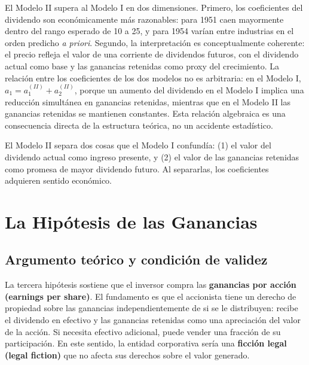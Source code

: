 \documentclass[12pt]{article}
\begin{document}
\begin{explicacion}
El Modelo II supera al Modelo I en dos dimensiones. Primero, los coeficientes del dividendo son econ\'omicamente m\'as razonables: para 1951 caen mayormente dentro del rango esperado de 10 a 25, y para 1954 var\'ian entre industrias en el orden predicho \textit{a priori}. Segundo, la interpretaci\'on es conceptualmente coherente: el precio refleja el valor de una corriente de dividendos futuros, con el dividendo actual como base y las ganancias retenidas como proxy del crecimiento. La relaci\'on entre los coeficientes de los dos modelos no es arbitraria: en el Modelo I, $a_1 = a_1^{(II)} + a_2^{(II)}$, porque un aumento del dividendo en el Modelo I implica una reducci\'on simult\'anea en ganancias retenidas, mientras que en el Modelo II las ganancias retenidas se mantienen constantes. Esta relaci\'on algebraica es una consecuencia directa de la estructura te\'orica, no un accidente estad\'istico.
\end{explicacion}

\begin{intuicion}
El Modelo II separa dos cosas que el Modelo I confund\'ia: (1) el valor del dividendo actual como ingreso presente, y (2) el valor de las ganancias retenidas como promesa de mayor dividendo futuro. Al separarlas, los coeficientes adquieren sentido econ\'omico.
\end{intuicion}

\section{La Hip\'otesis de las Ganancias}

\subsection{Argumento te\'orico y condici\'on de validez}

La tercera hip\'otesis sostiene que el inversor compra las \textbf{ganancias por acci\'on (earnings per share)}. El fundamento es que el accionista tiene un derecho de propiedad sobre las ganancias independientemente de si se le distribuyen: recibe el dividendo en efectivo y las ganancias retenidas como una apreciaci\'on del valor de la acci\'on. Si necesita efectivo adicional, puede vender una fracci\'on de su participaci\'on. En este sentido, la entidad corporativa ser\'ia una \textbf{ficci\'on legal (legal fiction)} que no afecta sus derechos sobre el valor generado.
\end{document}
